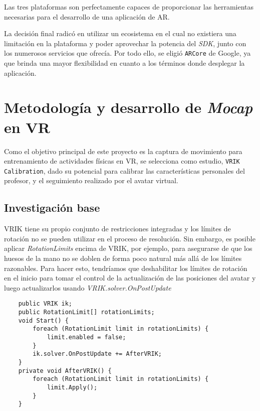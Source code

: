 Las tres plataformas son perfectamente capaces de proporcionar las herramientas necesarias para el desarrollo de una aplicación de AR.

La decisión final radicó en utilizar un ecosistema en el cual no existiera una limitación en la plataforma y poder aprovechar la potencia del \textit{SDK}, junto con los numerosos servicios que ofrecía. Por todo ello, se eligió \texttt{ARCore} de Google, ya que brinda una mayor flexibilidad en cuanto a los términos donde desplegar la aplicación.

\section{Metodología y desarrollo de \textit{Mocap} en VR}
\label{cap5:sec:capitulo5}

Como el objetivo principal de este proyecto es la captura de movimiento para entrenamiento de actividades físicas en VR, se selecciona como estudio, \texttt{VRIK Calibration}, dado su potencial para calibrar las características personales del profesor, y el seguimiento realizado por el avatar virtual.

\subsection{Investigación base}

VRIK tiene su propio conjunto de restricciones integradas y los límites de rotación no se pueden utilizar en el proceso de resolución. Sin embargo, es posible aplicar \textit{RotationLimits} encima de VRIK, por ejemplo, para asegurarse de que los huesos de la mano no se doblen de forma poco natural más allá de los límites razonables. Para hacer esto, tendríamos que deshabilitar los límites de rotación en el inicio para tomar el control de la actualización de las posiciones del avatar y luego actualizarlos usando \textit{VRIK.solver.OnPostUpdate}

\begin{lstlisting}
    public VRIK ik;
    public RotationLimit[] rotationLimits;
    void Start() {
        foreach (RotationLimit limit in rotationLimits) {
            limit.enabled = false;
        }
        ik.solver.OnPostUpdate += AfterVRIK;
    }
    private void AfterVRIK() {
        foreach (RotationLimit limit in rotationLimits) {
            limit.Apply();
        }
    }
\end{lstlisting}


